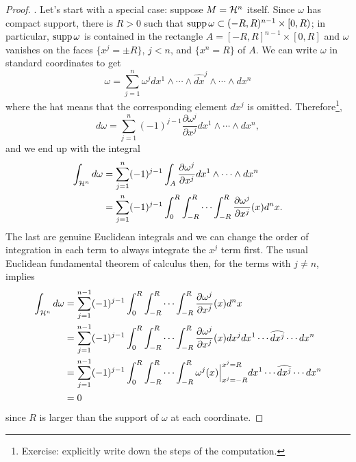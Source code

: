 \begin{proof}
	.
	Let's start with a special case: suppose $M = \mathcal{H}^n$ itself.
	Since $\omega$ has compact support, there is $R > 0$ such that $\operatorname{supp} \omega \subset (-R,R)^{n-1}\times[0,R)$; in particular, $\operatorname{supp}\omega$ is contained in the rectangle $A = [-R,R]^{n-1}\times[0,R]$ and $\omega$ vanishes on the faces $\{x^j=\pm R\}$, $j<n$, and $\{x^n=R\}$ of $A$.
	We can write $\omega$ in standard coordinates to get
	\begin{equation}
		\omega = \sum_{j=1}^n \omega^j dx^1 \wedge \cdots\wedge \widehat{dx}^j \wedge \cdots\wedge dx^n
	\end{equation}
	where the hat means that the corresponding element $dx^j$ is omitted.
	Therefore\footnote{Exercise: explicitly write down the steps of the computation.},
	\begin{equation}
		d\omega = \sum_{j=1}^n (-1)^{j-1} \frac{\partial \omega^j}{\partial x^j}dx^1\wedge\cdots\wedge dx^n,
	\end{equation}
	and we end up with the integral
	\begin{align}
		\int_{\cH^n} d\omega
		 & = \sum_{j=1}^n (-1)^{j-1} \int_A\frac{\partial \omega^j}{\partial x^j}dx^1\wedge\cdots\wedge dx^n                \\
		 & = \sum_{j=1}^n (-1)^{j-1} \int_0^R\int_{-R}^R\cdots\int_{-R}^{R}\frac{\partial \omega^j}{\partial x^j}(x) d^n x. %
	\end{align}
	The last are genuine Euclidean integrals and we can change the order of integration in each term to always integrate the $x^j$ term first.
	The usual Euclidean fundamental theorem of calculus then, for the terms with $j\neq n$, implies
	\begin{align}
		\int_{\cH^n} d\omega
		 & = \sum_{j=1}^{n-1} (-1)^{j-1} \int_0^R\int_{-R}^R\cdots\int_{-R}^{R}\frac{\partial \omega^j}{\partial x^j}(x) d^n x                                   \\ %
		 & =\sum_{j=1}^{n-1} (-1)^{j-1} \int_0^R\int_{-R}^R\cdots\int_{-R}^{R}\frac{\partial \omega^j}{\partial x^j}(x) dx^j dx^1\cdots\widehat{dx^j}\cdots dx^n \\
		 & =\sum_{j=1}^{n-1} (-1)^{j-1} \int_0^R\int_{-R}^R\cdots\int_{-R}^{R}\omega^j(x) \Big|_{x^j=-R}^{x^j=R} dx^1\cdots\widehat{dx^j}\cdots dx^n             \\
		 & = 0
	\end{align}
	since $R$ is larger than the support of $\omega$ at each coordinate.

\end{proof}
